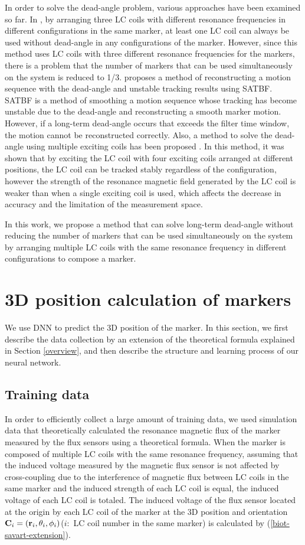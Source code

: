 \documentclass[journal,twoside,web]{ieeecolor}
\begin{document}
In order to solve the dead-angle problem, various approaches have been examined so far. In \cite{im6d}, by arranging three LC coils with different resonance frequencies in different configurations in the same marker, at least one LC coil can always be used without dead-angle in any configurations of the marker. However, since this method uses LC coils with three different resonance frequencies for the markers, there is a problem that the number of markers that can be used simultaneously on the system is reduced to 1/3. \cite{im3d+} proposes a method of reconstructing a motion sequence with the dead-angle and unstable tracking results using SATBF. SATBF is a method of smoothing a motion sequence whose tracking has become unstable due to the dead-angle and reconstructing a smooth marker motion. However, if a long-term dead-angle occurs that exceeds the filter time window, the motion cannot be reconstructed correctly.
Also, a method to solve the dead-angle using multiple exciting coils has been proposed \cite{four_ext_coil}. In this method, it was shown that by exciting the LC coil with four exciting coils arranged at different positions, the LC coil can be tracked stably regardless of the configuration, however the strength of the resonance magnetic field generated by the LC coil is weaker than when a single exciting coil is used, which affects the decrease in accuracy and the limitation of the measurement space.

In this work, we propose a method that can solve long-term dead-angle without reducing the number of markers that can be used simultaneously on the system by arranging multiple LC coils with the same resonance frequency in different configurations to compose a marker.

\section{3D position calculation of markers}
\label{dnn}
We use DNN to predict the 3D position of the marker. In this section, we first describe the data collection by an extension of the theoretical formula explained in Section \ref{overview}, and then describe the structure and learning process of our neural network.
\subsection{Training data}
In order to efficiently collect a large amount of training data, we used simulation data that theoretically calculated the resonance magnetic flux of the marker measured by the flux sensors using a theoretical formula. When the marker is composed of multiple LC coils with the same resonance frequency, assuming that the induced voltage measured by the magnetic flux sensor is not affected by cross-coupling  \cite {cross-coupling, cross-coupling2} due to the interference of magnetic flux between LC coils in the same marker and the induced strength of each LC coil is equal, the induced voltage of each LC coil is totaled. The induced voltage of the flux sensor located at the origin by each LC coil of the marker at the 3D position and orientation ${\bf C}_{i}=({\bf r}_{i}, \theta_{i}, \phi_{i}) $($i:$ LC coil number in the same marker) is calculated by (\ref{biot-savart-extension}).
\end{document}

